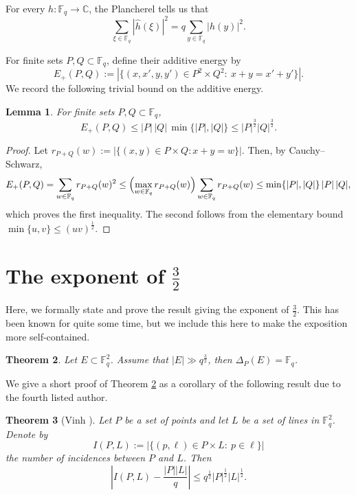 \documentclass{article}
\newtheorem{theorem}{Theorem}
\newtheorem{lemma}[theorem]{Lemma}
\newcommand{\F}{\mathbb{F}}
\newcommand{\abs}[1]{\left|#1\right|}
\newcommand{\1}{\mathbf{1}}
\begin{document}
For every $h:\F_q\to \mathbb{C}$, the Plancherel tells us that
\begin{equation}\label{lem:plancherel}
\sum_{\xi\in \F_q}\abs{\widehat{h}(\xi)}^2
=
q\sum_{y\in \F_q}\abs{h(y)}^2.
\end{equation}


For finite sets $P,Q\subset \F_q$, define their additive energy by
\[
E_+(P,Q):=
\abs{\{(x,x',y,y')\in P^2\times Q^2:\ x+y=x'+y'\}}.
\]
We record the following trivial bound on the additive energy.
\begin{lemma}\label{lem:energy-trivial}
For finite sets $P,Q\subset \F_q$,
\begin{equation*}
E_+(P,Q)
\le
|P|\,|Q|\,\min\{|P|,|Q|\}
\le
|P|^{\frac{3}{2}}|Q|^{\frac{3}{2}}.
\end{equation*}
\end{lemma}

\begin{proof}
Let $r_{P+Q}(w):=\abs{\{(x,y)\in P\times Q: x+y=w\}}$. Then, by Cauchy--Schwarz,
\[
E_+(P,Q)=\sum_{w\in \F_q}r_{P+Q}(w)^2
\le
\Bigl(\max_{w\in \F_q}r_{P+Q}(w)\Bigr)\sum_{w\in \F_q}r_{P+Q}(w)
\le
\min\{|P|,|Q|\}\, |P| \, |Q|,
\]
which proves the first inequality. The second follows from the elementary bound
$\min\{u,v\}\le(uv)^{\frac{1}{2}}$.
\end{proof}


\section{The exponent of $\frac{3}{2}$}\label{appendix-section}
Here, we formally state and prove the result giving the exponent of $\frac{3}{2}.$ This has been known for quite some time, but we include this here to make the exposition more self-contained.
\begin{theorem}\label{startingpoint}
    Let $E\subset \mathbb{F}_q^2$. Assume that $|E|\gg q^{\frac{3}{2}}$, then $\Delta_P(E)=\mathbb{F}_q$.
\end{theorem}
We give a short proof of Theorem \ref{startingpoint} as a corollary of the following result due to the fourth listed author.
\begin{theorem}[Vinh {\cite{LAV11}}]\label{thm:Vinh-point-line}
Let $P$ be a set of points and let $L$ be a set of lines in $\F_q^2$. Denote by
\[
I(P,L):=\bigl|\{(p,\ell)\in P\times L:\ p\in \ell\}\bigr|
\]
the number of incidences between $P$ and $L$. Then
\[
\left|I(P,L)-\frac{|P| |L|}{q}\right|
\le q^{\frac{1}{2}}|P|^{\frac{1}{2}}|L|^{\frac{1}{2}}.
\]
\end{theorem}
\end{document}
